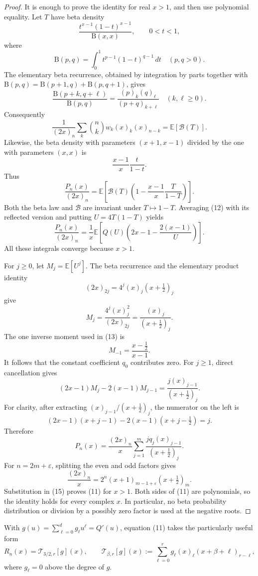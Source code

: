 \documentclass[11pt,a4paper]{article}
\begin{document}
\begin{proof} It is enough to prove the identity for real $x>1$, and then use polynomial equality. Let $T$ have beta density
\[
 \frac{t^{x-1}(1-t)^{x-1}}{\mathrm B(x,x)},\qquad 0<t<1,
\]
where
\[
 \mathrm B(p,q)=\int_0^1t^{p-1}(1-t)^{q-1}\,dt\quad(p,q>0).
\]
The elementary beta recurrence, obtained by integration by parts together with $\mathrm B(p,q)=\mathrm B(p+1,q)+\mathrm B(p,q+1)$, gives
\[
 \frac{\mathrm B(p+k,q+\ell)}{\mathrm B(p,q)}
 =\frac{(p)_k(q)_\ell}{(p+q)_{k+\ell}}
 \quad(k,\ell\geq0).
\]
Consequently
\[
 \frac1{(2x)_n}\sum_k\binom nk w_k(x)_k(x)_{n-k}
 =\mathbb E[\mathcal B(T)].
\]
Likewise, the beta density with parameters $(x+1,x-1)$ divided by the one with parameters $(x,x)$ is
\[
 \frac{x-1}{x}\frac{t}{1-t}.
\]
Thus
\[
 \frac{P_n(x)}{(2x)_n}
 =\mathbb E\!\left[\mathcal B(T)
     \left(1-\frac{x-1}{x}\frac{T}{1-T}\right)\right]. \tag{12}
\]
Both the beta law and $\mathcal B$ are invariant under $T\mapsto1-T$. Averaging (12) with its reflected version and putting $U=4T(1-T)$ yields
\[
 \frac{P_n(x)}{(2x)_n}
 =\frac1x\mathbb E\!\left[Q(U)
          \left(2x-1-\frac{2(x-1)}{U}\right)\right]. \tag{13}
\]
All these integrals converge because $x>1$.

For $j\geq0$, let $M_j=\mathbb E[U^j]$. The beta recurrence and the elementary product identity
\[
 (2x)_{2j}=4^j(x)_j(x+\tfrac12)_j
\]
give
\[
 M_j=\frac{4^j(x)_j^2}{(2x)_{2j}}
    =\frac{(x)_j}{(x+\tfrac12)_j}.
\]
The one inverse moment used in (13) is
\[
 M_{-1}=\frac{x-\tfrac12}{x-1}.
\]
It follows that the constant coefficient $q_0$ contributes zero. For $j\geq1$, direct cancellation gives
\[
 (2x-1)M_j-2(x-1)M_{j-1}
 =\frac{j(x)_{j-1}}{(x+\tfrac12)_j}. \tag{14}
\]
For clarity, after extracting $(x)_{j-1}/(x+\tfrac12)_j$, the numerator on the left is
\[
 (2x-1)(x+j-1)-2(x-1)(x+j-\tfrac12)=j.
\]
Therefore
\[
 P_n(x)=\frac{(2x)_n}{x}
       \sum_{j=1}^m\frac{j q_j(x)_{j-1}}{(x+\tfrac12)_j}. \tag{15}
\]
For $n=2m+\varepsilon$, splitting the even and odd factors gives
\[
 \frac{(2x)_n}{x}
 =2^n(x+1)_{m-1+\varepsilon}(x+\tfrac12)_m.
\]
Substitution in (15) proves (11) for $x>1$. Both sides of (11) are polynomials, so the identity holds for every complex $x$. In particular, no beta probability distribution or division by a possibly zero factor is used at the negative roots. \end{proof}

With \(g(u)=\sum_{\ell=0}^d g_\ell u^\ell=Q'(u)\), equation (11) takes the particularly useful form \[
 R_n(x)=\mathcal T_{3/2,r}[g](x),\qquad
 \mathcal T_{\beta,r}[g](x)
   :=\sum_{\ell=0}^r g_\ell(x)_\ell(x+\beta+\ell)_{r-\ell}, \tag{16}
\] where \(g_\ell=0\) above the degree of \(g\).
\end{document}

